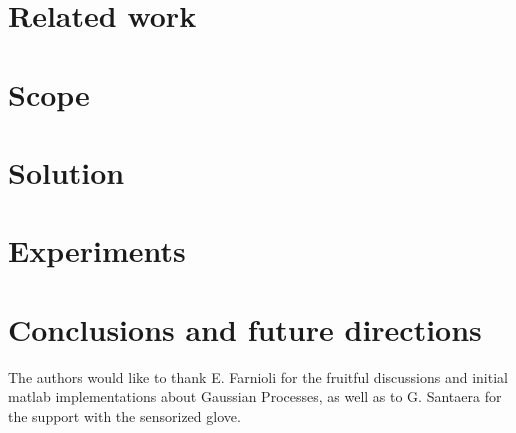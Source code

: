 \section{Related work}
\label{sec:related}



\section{Scope}
\label{sec:scope}



\section{Solution}
\label{sec:solution}



\section{Experiments}
\label{sec:experiments}



\section{Conclusions and future directions}
\label{sec:conclusions}



\begin{acknowledgements}
The authors would like to thank E. Farnioli for the fruitful discussions and
initial matlab implementations about Gaussian Processes, as well as to G.
Santaera for the support with the sensorized glove.
\end{acknowledgements}





